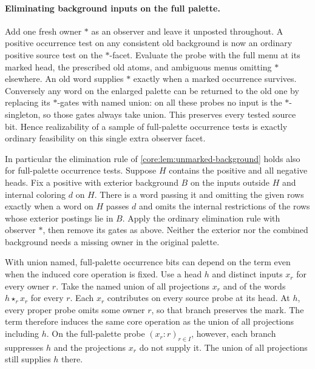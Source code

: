 \paragraph{Eliminating background inputs on the full palette.}
Add one fresh owner $*$ as an observer and leave it
unposted throughout. A positive occurrence test on any
consistent old background is now an ordinary positive
source test on the $*$-facet. Evaluate the probe with
the full menu at its marked head, the prescribed old
atoms, and ambiguous menus omitting $*$ elsewhere.
An old word supplies $*$ exactly when a marked
occurrence survives. Conversely any word on the enlarged
palette can be returned to the old one by replacing its
$*$-gates with named union: on all these probes no input
is the $*$-singleton, so those gates always take union.
This preserves every tested source bit. Hence realizability
of a sample of full-palette occurrence tests is exactly
ordinary feasibility on this single extra observer facet.

In particular the elimination rule of
\cref{core:lem:unmarked-background} holds also for
full-palette occurrence tests. Suppose $H$ contains
the positive and all negative heads. Fix a positive
with exterior background $B$ on the inputs outside
$H$ and internal coloring $d$ on $H$. There is a
word passing it and omitting the given rows exactly
when a word on $H$ passes $d$ and omits the internal
restrictions of the rows whose exterior postings lie
in $B$. Apply the ordinary elimination rule with
observer $*$, then remove its gates as above. Neither
the exterior nor the combined background needs a
missing owner in the original palette.

With union named, full-palette occurrence bits
can depend on the term even when the induced
core operation is fixed. Use a head $h$ and distinct
inputs $x_r$ for every owner $r$. Take the named
union of all projections $x_r$ and of the
words $h\star_r x_r$ for every $r$. Each $x_r$
contributes on every source probe at its head.
At $h$, every proper probe omits some owner
$r$, so that branch preserves the mark.
The term therefore induces the same core
operation as the union of all projections
including $h$. On the full-palette probe
$(x_r:r)_{r\in I}$, however, each branch
suppresses $h$ and the projections $x_r$
do not supply it. The union of all projections
still supplies $h$ there.

